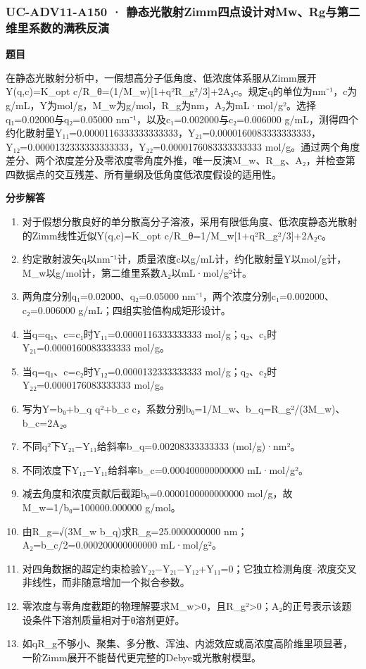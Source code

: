 \documentclass[UTF8,11pt,a4paper]{ctexart}
\begin{document}
\subsubsection*{UC-ADV11-A150 · 静态光散射Zimm四点设计对Mw、Rg与第二维里系数的满秩反演}
\noindent\textbf{题目}\par
在静态光散射分析中，一假想高分子低角度、低浓度体系服从Zimm展开Y(q,c)=K\_opt c/R\_θ=(1/M\_w)[1+q²R\_g²/3]+2A₂c。规定q的单位为nm⁻¹，c为g/mL，Y为mol/g，M\_w为g/mol，R\_g为nm，A₂为mL·mol/g²。选择q₁=0.02000与q₂=0.05000 nm⁻¹，以及c₁=0.002000与c₂=0.006000 g/mL，测得四个约化散射量Y₁₁=0.0000116333333333333，Y₂₁=0.0000160083333333333，Y₁₂=0.0000132333333333333，Y₂₂=0.0000176083333333333 mol/g。通过两个角度差分、两个浓度差分及零浓度零角度外推，唯一反演M\_w、R\_g、A₂，并检查第四数据点的交互残差、所有量纲及低角度低浓度假设的适用性。\par
\medskip\noindent\textbf{分步解答}
\begin{enumerate}
\item 对于假想分散良好的单分散高分子溶液，采用有限低角度、低浓度静态光散射的Zimm线性近似Y(q,c)=K\_opt c/R\_θ=1/M\_w[1+q²R\_g²/3]+2A₂c。
\item 约定散射波矢q以nm⁻¹计，质量浓度c以g/mL计，约化散射量Y以mol/g计，M\_w以g/mol计，第二维里系数A₂以mL·mol/g²计。
\item 两角度分别q₁=0.02000、q₂=0.05000 nm⁻¹，两个浓度分别c₁=0.002000、c₂=0.006000 g/mL；四组实验值构成矩形设计。
\item 当q=q₁、c=c₁时Y₁₁=0.0000116333333333 mol/g；q₂、c₁时Y₂₁=0.0000160083333333 mol/g。
\item 当q=q₁、c=c₂时Y₁₂=0.0000132333333333 mol/g；q₂、c₂时Y₂₂=0.0000176083333333 mol/g。
\item 写为Y=b₀+b\_q q²+b\_c c，系数分别b₀=1/M\_w、b\_q=R\_g²/(3M\_w)、b\_c=2A₂。
\item 不同q²下Y₂₁−Y₁₁给斜率b\_q=0.00208333333333 (mol/g)·nm²。
\item 不同浓度下Y₁₂−Y₁₁给斜率b\_c=0.000400000000000 mL·mol/g²。
\item 减去角度和浓度贡献后截距b₀=0.0000100000000000 mol/g，故M\_w=1/b₀=100000.000000 g/mol。
\item 由R\_g=√(3M\_w b\_q)求R\_g=25.0000000000 nm；A₂=b\_c/2=0.000200000000000 mL·mol/g²。
\item 对四角数据的超定约束检验Y₂₂−Y₂₁−Y₁₂+Y₁₁=0；它独立检测角度–浓度交叉非线性，而非随意增加一个拟合参数。
\item 零浓度与零角度截距的物理解要求M\_w>0，且R\_g²>0；A₂的正号表示该题设条件下溶剂质量相对于θ溶剂更好。
\item 如qR\_g不够小、聚集、多分散、浑浊、内滤效应或高浓度高阶维里项显著，一阶Zimm展开不能替代更完整的Debye或光散射模型。
\end{enumerate}
\end{document}
